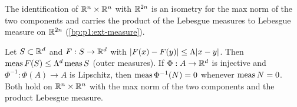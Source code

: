 \begin{remark}[Products]\label{bp:p1:lip-image-product}
The identification of $\mathbb{R}^n\times\mathbb{R}^n$ with $\mathbb{R}^{2n}$ is an isometry for the max norm of the two
components and carries the product of the Lebesgue measures to Lebesgue measure on $\mathbb{R}^{2n}$
(\ref{bp:p1:ext-measure}).
\end{remark}

\begin{lemma}\label{bp:p1:lip-image}
Let $S\subset\mathbb{R}^d$ and $F:S\to\mathbb{R}^d$ with $\lvert F(x)-F(y)\rvert\le\Lambda\lvert x-y\rvert$. Then $\operatorname{meas} F(S)\le\Lambda^d\operatorname{meas} S$
(outer measures). If $\Phi:A\to\mathbb{R}^d$ is injective and $\Phi^{-1}:\Phi(A)\to A$ is Lipschitz, then
$\operatorname{meas}\Phi^{-1}(N)=0$ whenever $\operatorname{meas} N=0$. Both hold on $\mathbb{R}^n\times\mathbb{R}^n$ with the max norm of the two
components and the product Lebesgue measure.
\end{lemma}

